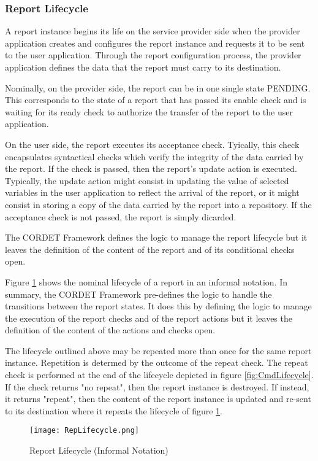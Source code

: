\subsubsection{Report Lifecycle}\label{sec:RepLifecycle}

A report instance begins its life on the service provider side when the provider application creates and configures the report instance and requests it to be sent to the user application. Through the report configuration process, the provider application defines the data that the report must carry to its destination.

Nominally, on the provider side, the report can be in one single state PENDING. This corresponds to the state of a report that has passed its enable check and is waiting for its ready check to authorize the transfer of the report to the user application. 

On the user side, the report executes its acceptance check. Tyically, this check encapsulates syntactical checks which verify the integrity of the data carried by the report. If the check is passed, then the report's update action is executed. Typically, the update action might consist in updating the value of selected variables in the user application to reflect the arrival of the report, or it might consist in storing a copy of the data carried by the report into a repository. If the acceptance check is not passed, the report is simply dicarded.  

The CORDET Framework defines the logic to manage the report lifecycle but it leaves the definition of the content of the report and of its conditional checks open.

Figure \ref{fig:RepLifecycle} shows the nominal lifecycle of a report in an informal notation. In summary, the CORDET Framework pre-defines the logic to handle the transitions between the report states. It does this by defining the logic to manage the execution of the report checks and of the report actions but it leaves the definition of the content of the actions and checks open. 

The lifecycle outlined above may be repeated more than once for the same report instance. Repetition is determed by the outcome of the repeat check. The repeat check is performed at the end of the lifecycle depicted in figure \ref{fig:CmdLifecycle}. If the check returns "no repeat", then the report instance is destroyed. If instead, it returns "repeat", then the content of the report instance is updated and re-sent to its destination where it repeats the lifecycle of figure \ref{fig:RepLifecycle}.

\begin{figure}[H]
 \centering
 \texttt{[image: RepLifecycle.png]}
 \caption{Report Lifecycle (Informal Notation)}
 \label{fig:RepLifecycle}
\end{figure}


